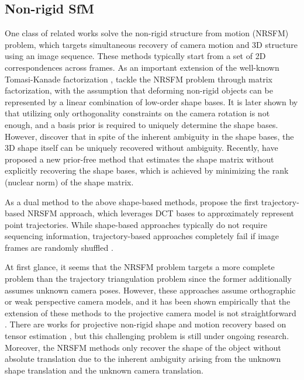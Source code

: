 \subsection{Non-rigid SfM}
One class of related works solve the non-rigid structure from motion (NRSFM) problem, which targets simultaneous recovery of camera motion and 3D structure using an image sequence. These methods typically start from a set of 2D correspondences across frames. As an important extension of the well-known Tomasi-Kanade factorization \cite{tomasi1992shape}, \citet{Bregler_CVPR2000} tackle the NRSFM problem through matrix factorization, with the assumption that deforming non-rigid objects can be represented by a linear combination of low-order shape bases. It is later shown by \citet{Xiao_ECCV2004} that utilizing only orthogonality constraints on the camera rotation is not enough, and a basis prior is required to uniquely determine the shape bases. However, \citet{akhter2009defense} discover that in spite of the inherent ambiguity in the shape bases, the 3D shape itself can be uniquely recovered without ambiguity. Recently, \cite{dai2014simple} have proposed a new prior-free method that estimates the shape matrix without explicitly recovering the shape bases, which is achieved by minimizing the rank (nuclear norm) of the shape matrix. 

As a dual method to the above shape-based methods, \citet{Akhter_NIPS08} propose the first trajectory-based NRSFM approach, which leverages DCT bases to approximately represent point trajectories. While shape-based approaches typically do not require sequencing information, trajectory-based approaches completely fail if image frames are randomly shuffled \cite{dai2014simple}.

At first glance, it seems that the NRSFM problem targets a more complete problem than the trajectory triangulation problem since the former additionally assumes unknown camera poses.
However, these approaches assume orthographic or weak perspective camera models, and it has been shown empirically that the extension of these methods to the projective camera model is not straightforward \cite{Park_ECCV2010}. There are works for projective non-rigid shape and motion recovery based on tensor estimation \cite{hartley2008perspective,vidal2006nonrigid}, but this challenging problem is still under ongoing research. Moreover, the NRSFM methods only recover the shape of the object without absolute translation due to the inherent ambiguity arising from the unknown shape translation and the unknown camera translation. 

